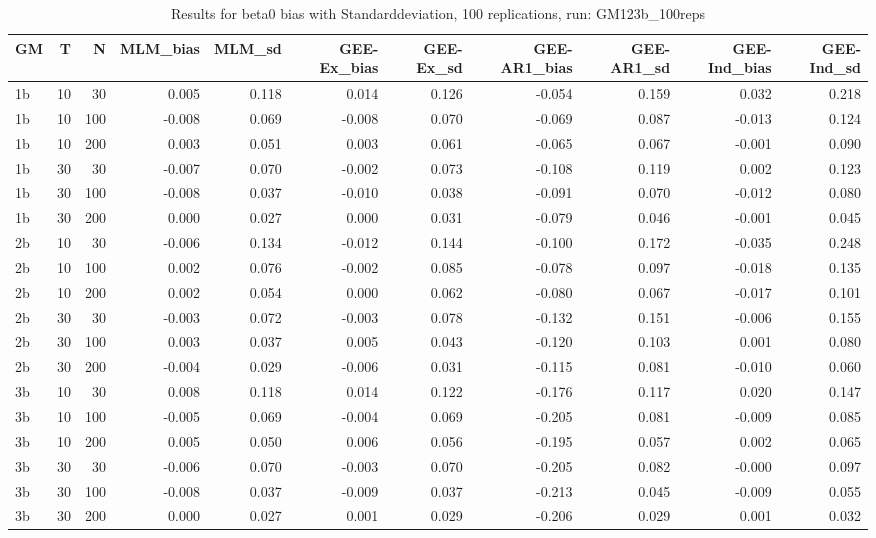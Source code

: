 \begin{table}[ht]
\centering
\begin{tabular}{lrrrrrrrrrr}
  \hline
GM & T & N & MLM\_bias & MLM\_sd & GEE-Ex\_bias & GEE-Ex\_sd & GEE-AR1\_bias & GEE-AR1\_sd & GEE-Ind\_bias & GEE-Ind\_sd \\ 
  \hline
1b & 10 & 30 & 0.005 & 0.118 & 0.014 & 0.126 & -0.054 & 0.159 & 0.032 & 0.218 \\ 
  1b & 10 & 100 & -0.008 & 0.069 & -0.008 & 0.070 & -0.069 & 0.087 & -0.013 & 0.124 \\ 
  1b & 10 & 200 & 0.003 & 0.051 & 0.003 & 0.061 & -0.065 & 0.067 & -0.001 & 0.090 \\ 
  1b & 30 & 30 & -0.007 & 0.070 & -0.002 & 0.073 & -0.108 & 0.119 & 0.002 & 0.123 \\ 
  1b & 30 & 100 & -0.008 & 0.037 & -0.010 & 0.038 & -0.091 & 0.070 & -0.012 & 0.080 \\ 
  1b & 30 & 200 & 0.000 & 0.027 & 0.000 & 0.031 & -0.079 & 0.046 & -0.001 & 0.045 \\ 
   \hline
2b & 10 & 30 & -0.006 & 0.134 & -0.012 & 0.144 & -0.100 & 0.172 & -0.035 & 0.248 \\ 
  2b & 10 & 100 & 0.002 & 0.076 & -0.002 & 0.085 & -0.078 & 0.097 & -0.018 & 0.135 \\ 
  2b & 10 & 200 & 0.002 & 0.054 & 0.000 & 0.062 & -0.080 & 0.067 & -0.017 & 0.101 \\ 
  2b & 30 & 30 & -0.003 & 0.072 & -0.003 & 0.078 & -0.132 & 0.151 & -0.006 & 0.155 \\ 
  2b & 30 & 100 & 0.003 & 0.037 & 0.005 & 0.043 & -0.120 & 0.103 & 0.001 & 0.080 \\ 
  2b & 30 & 200 & -0.004 & 0.029 & -0.006 & 0.031 & -0.115 & 0.081 & -0.010 & 0.060 \\ 
   \hline
3b & 10 & 30 & 0.008 & 0.118 & 0.014 & 0.122 & -0.176 & 0.117 & 0.020 & 0.147 \\ 
  3b & 10 & 100 & -0.005 & 0.069 & -0.004 & 0.069 & -0.205 & 0.081 & -0.009 & 0.085 \\ 
  3b & 10 & 200 & 0.005 & 0.050 & 0.006 & 0.056 & -0.195 & 0.057 & 0.002 & 0.065 \\ 
  3b & 30 & 30 & -0.006 & 0.070 & -0.003 & 0.070 & -0.205 & 0.082 & -0.000 & 0.097 \\ 
  3b & 30 & 100 & -0.008 & 0.037 & -0.009 & 0.037 & -0.213 & 0.045 & -0.009 & 0.055 \\ 
  3b & 30 & 200 & 0.000 & 0.027 & 0.001 & 0.029 & -0.206 & 0.029 & 0.001 & 0.032 \\ 
   \hline
\end{tabular}
\caption{Results for beta0 bias with Standarddeviation, 100 replications, run: GM123b_100reps} 
\label{tab:beta0_bias_sd}
\end{table}
